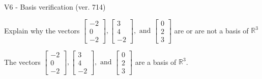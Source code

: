 \begin{exercise}
  \begin{exerciseTitle}V6 - Basis verification (ver. 714)\end{exerciseTitle}
  \begin{exerciseStatement}
    Explain why the vectors \(\left[\begin{array}{r}
-2 \\
0 \\
-2
\end{array}\right] , \left[\begin{array}{r}
3 \\
4 \\
-2
\end{array}\right] , \text{ and } \left[\begin{array}{r}
0 \\
2 \\
3
\end{array}\right]\) are or are not a basis of \(\mathbb{R}^3\)	


  \end{exerciseStatement}
  \begin{exerciseAnswer}
   The vectors \(\left[\begin{array}{r}
-2 \\
0 \\
-2
\end{array}\right] , \left[\begin{array}{r}
3 \\
4 \\
-2
\end{array}\right] , \text{ and } \left[\begin{array}{r}
0 \\
2 \\
3
\end{array}\right]\) 
  	 are  a basis of \(\mathbb{R}^3\).
  


  \end{exerciseAnswer}
\end{exercise}